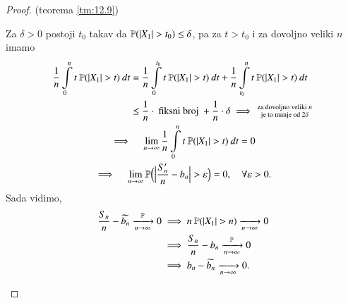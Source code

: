 \begin{proof}{(teorema \ref{tm:12.9})}
\begin{itemize}
        Za $\delta > 0$ postoji $t_0$ takav da $\mathbb{P}({|X_1| > t_0}) \leq \delta$, pa za $t > t_0$ i za dovoljno veliki $n$ imamo
        \begin{equation*}
            \begin{gathered}
                \begin{aligned}
                    \frac{1}{n} \int\limits_0^n t \: \mathbb{P}({|X_1| > t}) \: dt &= \frac{1}{n} \int\limits_0^{t_0} t \: \mathbb{P}({|X_1| > t}) \: dt + \frac{1}{n} \int\limits_{t_0}^n t \: \mathbb{P}({|X_1| > t}) \: dt\\
                    &\leq \frac{1}{n} \cdot \textnormal{ fiksni broj } + \frac{1}{n} \cdot \delta \implies
                    \begin{smallmatrix}
                        \textnormal{za dovoljno veliki } n\\
                        \textnormal{je to manje od } 2 \delta
                    \end{smallmatrix}
                \end{aligned}\\
                \implies \quad \lim\limits_{n \to \infty} \frac{1}{n} \int\limits_0^n t \: \mathbb{P}({|X_1| > t}) \: dt = 0\\
                \implies \quad \lim\limits_{n \to \infty} \mathbb{P} \Big( \Big| \frac{S_n'}{n} -b_n \Big| > \varepsilon \Big) = 0, \quad \forall \varepsilon > 0.
            \end{gathered}
        \end{equation*}
        Sada vidimo,
        \begin{equation*}
            \begin{aligned}
                \frac{S_n}{n} - \widetilde{b_n} \xrightarrow[n \to \infty]{\mathbb{P}} 0 &\implies n \: \mathbb{P}({|X_1| > n}) \xrightarrow[n \to \infty]{} 0\\
                &\implies \frac{S_n}{n} - b_n \xrightarrow[n \to \infty]{\mathbb{P}} 0\\
                &\implies b_n - \widetilde{b_n} \xrightarrow[n \to \infty]{} 0.
            \end{aligned}
        \end{equation*}
    \end{itemize}
\end{proof}

